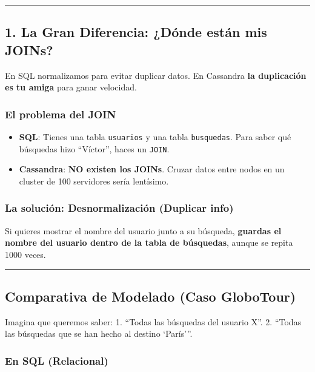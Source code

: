\documentclass[12pt,a4paper]{article}
\begin{document}
\begin{center}\rule{0.5\linewidth}{0.5pt}\end{center}

\subsection{1. La Gran Diferencia: ¿Dónde están mis JOINs?}\label{la-gran-diferencia-duxf3nde-estuxe1n-mis-joins}

En SQL normalizamos para evitar duplicar datos. En Cassandra \textbf{la duplicación es tu amiga} para ganar velocidad.

\subsubsection{El problema del JOIN}

\begin{itemize}
    \item \textbf{SQL}: Tienes una tabla \texttt{usuarios} y una tabla \texttt{busquedas}. Para saber qué búsquedas hizo \enquote{Víctor}, haces un \texttt{JOIN}.
    \item \textbf{Cassandra}: \textbf{NO existen los JOINs}. Cruzar datos entre nodos en un cluster de 100 servidores sería lentísimo.
\end{itemize}

\subsubsection{La solución: Desnormalización (Duplicar info)}

Si quieres mostrar el nombre del usuario junto a su búsqueda, \textbf{guardas el nombre del usuario dentro de la tabla de búsquedas}, aunque se repita 1000 veces.

\begin{center}\rule{0.5\linewidth}{0.5pt}\end{center}

\subsection{Comparativa de Modelado (Caso GloboTour)}\label{comparativa-de-modelado-caso-globotour}

Imagina que queremos saber: 1. \enquote{Todas las búsquedas del usuario X}. 2. \enquote{Todas las búsquedas que se han hecho al destino \enquote{París}}.

\subsubsection{En SQL (Relacional)}
\end{document}
